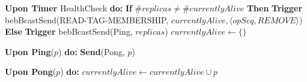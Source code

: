 \documentclass[10pt,a4paper,twocolumn]{article}
\begin{document}
\begin{algorithm}
\begin{algorithmic}
		\State \textbf{Upon Timer } HealthCheck \textbf{ do:}
		\State \hspace{1em} \textbf{If} $\#replicas \neq \#currentlyAlive$ \textbf{Then}
		\State \hspace{3em} \textbf{Trigger} bebBcastSend(READ-TAG-MEMBERSHIP, $currentlyAlive, \langle opSeq, REMOVE\rangle$)
		\State \hspace{1em} \textbf{Else}
		\State \hspace{3em} \textbf{Trigger} bebBcastSend(Ping, $replicas$)
		\State \hspace{1em} $currentlyAlive \leftarrow \{\}$
		\State

		\State \textbf{Upon Ping}($p$) \textbf{do:}
		\State \hspace{3em} \textbf{Send}(Pong, $p$)
		\State


		\State \textbf{Upon Pong}($p$) \textbf{do:}
		\State \hspace{3em} $currentlyAlive \leftarrow currentlyAlive \cup p$
		\State
	\end{algorithmic}
\end{algorithm}
\end{document}
